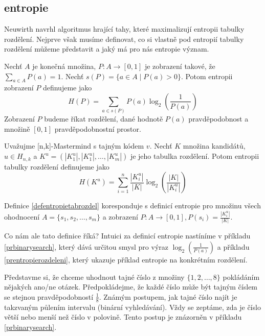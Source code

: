 

\subsection{entropie}
Neuwirth \cite{neuwirth} 
navrhl algoritmus hrající tahy, které maximalizují entropii tabulky rozdělení. Nejprve však musíme definovat, co si vlastně pod entropií tabulky rozdělení můžeme představit a jaký má pro nás entropie význam.

\begin{definice}[Entropie]\label{defentropie}
  Nechť $A$ je konečná množina, $P \colon A \to [0,1]$ je zobrazení takové, že $\sum_{a \in A} P(a) = 1$. Nechť $s(P) = \{ a \in A \mid P(a) > 0\}$. Potom entropii zobrazení $P$ definujeme jako 
  \[H(P) = \sum_{a \in s(P)}P(a)\log_2\left(\frac{1}{P(a)}\right)\]
  Zobrazení $P$ budeme říkat rozdělení, dané hodnotě $P(a)$ pravděpodobnost a množině $[0,1]$ pravděpodobnostní prostor. 
\end{definice}

\begin{definice}\label{defentropietabrozdel}
  Uvažujme [n,k]-Mastermind s tajným kódem $v$. Nechť $K$ množina kandidátů, $u \in H_{n,k}$ a $K^u = (|K^u_1|, |K^u_1|, \dots, |K^u_m|)$ je jeho tabulka rozdělení. Potom entropii tabulky rozdělení definujeme jako
  \[H(K^u) = \sum_{i=1}^n \frac{|K^u_i|}{|K|}\log_2\left( \frac{|K|}{|K^u_i|} \right)\]
\end{definice}

\begin{pozn}
    Definice \ref{defentropietabrozdel} koresponduje s definicí entropie pro množinu všech ohodnocení $A = \{s_1, s_2, \dots, s_m \}$ a zobrazení $P\colon A \to [0,1], P(s_i) = \frac{|K^u_i|}{|K|}$.
\end{pozn}

Co nám ale tato definice říká? Intuici za definicí entropie nastíníme v příkladu \ref{prbinarysearch}, který dává určitou smysl pro výraz $\log_2\left(\frac{1}{P(a)}\right)$ a příkladu \ref{prentropierozdeleni}, který ukazuje příklad entropie na konkrétním rozdělení.

Představme si, že chceme uhodnout tajné číslo z množiny $\{1,2,\dots,8\}$ pokládáním nějakých ano/ne otázek. Předpokládejme, že každé číslo může být tajným číslem se stejnou pravděpodobností $\frac{1}{8}$. Známým postupem, jak tajné číslo najít je takzvaným půlením intervalu (binární vyhledávání). Vždy se zeptáme, zda je číslo větší nebo menší než číslo v polovině. Tento postup je znázorněn v příkladu \ref{prbinarysearch}.

